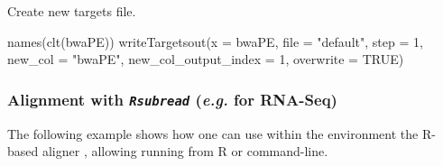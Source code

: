 \documentclass[14pt,]{article}
\newcommand{\hlnum}[1]{\textcolor[rgb]{0.816,0.125,0.439}{#1}}%
\newcommand{\hlstr}[1]{\textcolor[rgb]{0.251,0.627,0.251}{#1}}%
\newcommand{\hlstd}[1]{\textcolor[rgb]{0.251,0.251,0.251}{#1}}%
\newenvironment{Shaded}{\begin{myshaded}}{\end{myshaded}}
\newcommand{\DecValTok}[1]{\hlnum{#1}}
\newcommand{\ConstantTok}[1]{\hlnum{#1}}
\newcommand{\StringTok}[1]{\hlstr{#1}}
\newcommand{\FunctionTok}[1]{\hlstd{#1}}
\newcommand{\AttributeTok}[1]{{#1}}
\newcommand{\NormalTok}[1]{\hlstd{#1}}
\begin{document}
Create new targets file.

\begin{Shaded}
\begin{Highlighting}[]
\FunctionTok{names}\NormalTok{(}\FunctionTok{clt}\NormalTok{(bwaPE))}
\FunctionTok{writeTargetsout}\NormalTok{(}\AttributeTok{x =}\NormalTok{ bwaPE, }\AttributeTok{file =} \StringTok{"default"}\NormalTok{, }\AttributeTok{step =} \DecValTok{1}\NormalTok{, }\AttributeTok{new\_col =} \StringTok{"bwaPE"}\NormalTok{, }\AttributeTok{new\_col\_output\_index =} \DecValTok{1}\NormalTok{, }
    \AttributeTok{overwrite =} \ConstantTok{TRUE}\NormalTok{)}
\end{Highlighting}
\end{Shaded}

\hypertarget{alignment-with-rsubread-e.g.-for-rna-seq}{%
\subsubsection{\texorpdfstring{Alignment with \emph{\texttt{Rsubread}} (\emph{e.g.} for RNA-Seq)}{Alignment with Rsubread (e.g. for RNA-Seq)}}\label{alignment-with-rsubread-e.g.-for-rna-seq}}

The following example shows how one can use within the  environment the R-based aligner , allowing running from R or command-line.
\end{document}
